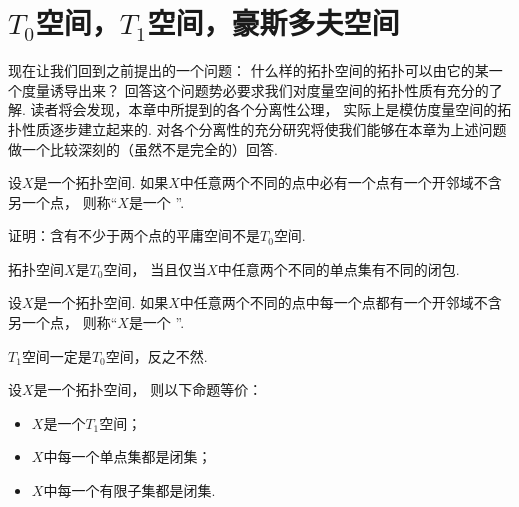 \section{\texorpdfstring{\(T_0\)}{T0}空间，\texorpdfstring{\(T_1\)}{T1}空间，豪斯多夫空间}
现在让我们回到之前提出的一个问题：
什么样的拓扑空间的拓扑可以由它的某一个度量诱导出来？
回答这个问题势必要求我们对度量空间的拓扑性质有充分的了解.
读者将会发现，本章中所提到的各个分离性公理，
实际上是模仿度量空间的拓扑性质逐步建立起来的.
对各个分离性的充分研究将使我们能够在本章为上述问题做一个比较深刻的（虽然不是完全的）回答.

\begin{definition}
设\(X\)是一个拓扑空间.
如果\(X\)中任意两个不同的点中必有一个点有一个开邻域不含另一个点，
则称“\(X\)是一个 ”.
\end{definition}

\begin{example}
证明：含有不少于两个点的平庸空间不是\(T_0\)空间.
\end{example}

\begin{theorem}
拓扑空间\(X\)是\(T_0\)空间，
当且仅当\(X\)中任意两个不同的单点集有不同的闭包.
\end{theorem}

\begin{definition}
设\(X\)是一个拓扑空间.
如果\(X\)中任意两个不同的点中每一个点都有一个开邻域不含另一个点，
则称“\(X\)是一个 ”.
\end{definition}

\begin{proposition}
\(T_1\)空间一定是\(T_0\)空间，反之不然.
\end{proposition}

\begin{theorem}
设\(X\)是一个拓扑空间，
则以下命题等价：\begin{itemize}
	\item \(X\)是一个\(T_1\)空间；
	\item \(X\)中每一个单点集都是闭集；
	\item \(X\)中每一个有限子集都是闭集.
\end{itemize}
\end{theorem}


